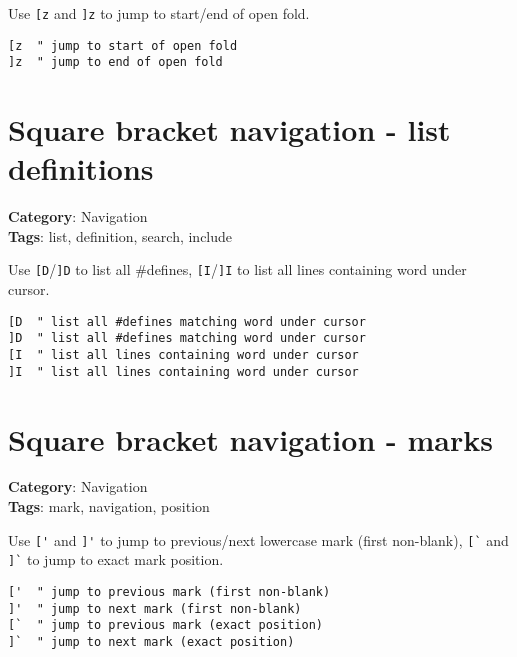 {{{{{{{{{{Use {\footnotesize \Verb§[z§} and {\footnotesize \Verb§]z§} to jump to start/end of open fold.

\begin{Exa*}{}
\begin{Verbatim}[fontsize=\footnotesize, breaklines, breakanywhere]
[z  " jump to start of open fold
]z  " jump to end of open fold
\end{Verbatim}
\end{Exa*}

\section{Square bracket navigation - list definitions}

\textbf{Category}: Navigation\\ \textbf{Tags}: list, definition, search, include
\vspace{0.5cm}

Use {\footnotesize \Verb§[D§}/{\footnotesize \Verb§]D§} to list all \#defines, {\footnotesize \Verb§[I§}/{\footnotesize \Verb§]I§} to list all lines containing word under cursor.

\begin{Exa*}{}
\begin{Verbatim}[fontsize=\footnotesize, breaklines, breakanywhere]
[D  " list all #defines matching word under cursor
]D  " list all #defines matching word under cursor  
[I  " list all lines containing word under cursor
]I  " list all lines containing word under cursor
\end{Verbatim}
\end{Exa*}

\section{Square bracket navigation - marks}

\textbf{Category}: Navigation\\ \textbf{Tags}: mark, navigation, position
\vspace{0.5cm}

Use {\footnotesize \Verb§['§} and {\footnotesize \Verb§]'§} to jump to previous/next lowercase mark (first non-blank), {\footnotesize \Verb§[`§} and {\footnotesize \Verb§]`§} to jump to exact mark position.

\begin{Exa*}{}
\begin{Verbatim}[fontsize=\footnotesize, breaklines, breakanywhere]
['  " jump to previous mark (first non-blank)
]'  " jump to next mark (first non-blank)
[`  " jump to previous mark (exact position)
]`  " jump to next mark (exact position)
\end{Verbatim}
\end{Exa*}

}}}}}}}}}}

